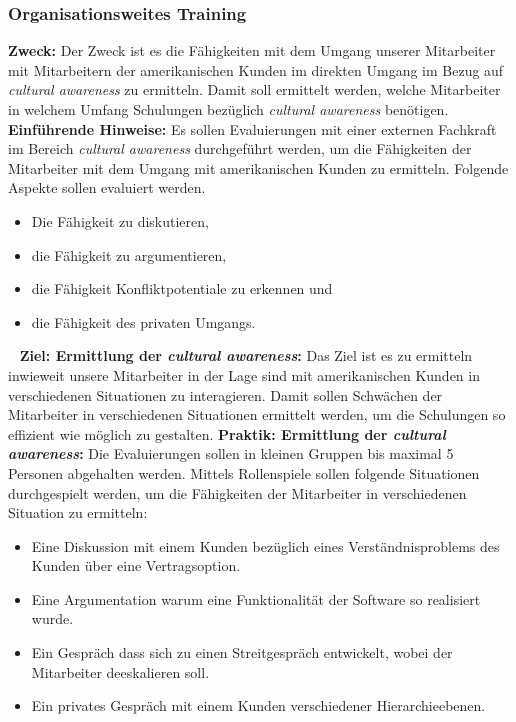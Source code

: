 \subsubsection{Organisationsweites Training}
\label{sec:cmmi-2}
\textbf{Zweck:}
\newline
Der Zweck ist es die Fähigkeiten mit dem Umgang unserer Mitarbeiter mit Mitarbeitern der amerikanischen Kunden im direkten Umgang im Bezug auf \emph{cultural awareness} zu ermitteln. Damit soll ermittelt werden, welche Mitarbeiter in welchem Umfang Schulungen bezüglich \emph{cultural awareness} benötigen.
\newline
\newline
\textbf{Einführende Hinweise:}
\newline
Es sollen Evaluierungen mit einer externen Fachkraft im Bereich \emph{cultural awareness} durchgeführt werden, um die Fähigkeiten der Mitarbeiter mit dem Umgang mit amerikanischen Kunden zu ermitteln. Folgende Aspekte sollen evaluiert werden.
\begin{itemize}
	\item Die Fähigkeit zu diskutieren,
	\item die Fähigkeit zu argumentieren,
	\item die Fähigkeit Konfliktpotentiale zu erkennen und 
	\item die Fähigkeit des privaten Umgangs.
\end{itemize}
\ \newpage
\textbf{Ziel: Ermittlung der \emph{cultural awareness}:}
\newline
Das Ziel ist es zu ermitteln inwieweit unsere Mitarbeiter in der Lage sind mit amerikanischen Kunden in verschiedenen Situationen zu interagieren. Damit sollen Schwächen der Mitarbeiter in verschiedenen Situationen ermittelt werden, um die Schulungen so effizient wie möglich zu gestalten.
\newline
\newline
\textbf{Praktik: Ermittlung der \emph{cultural awareness}:}
\newline
Die Evaluierungen sollen in kleinen Gruppen bis maximal 5 Personen abgehalten werden. Mittels Rollenspiele sollen folgende Situationen durchgespielt werden, um die Fähigkeiten der Mitarbeiter in verschiedenen Situation zu ermitteln:
\begin{itemize}
	\item Eine Diskussion mit einem Kunden bezüglich eines Verständnisproblems des Kunden über eine Vertragsoption.
	\item Eine Argumentation warum eine Funktionalität der Software so realisiert wurde.
	\item Ein Gespräch dass sich zu einen Streitgespräch entwickelt, wobei der Mitarbeiter deeskalieren soll.
	\item Ein privates Gespräch mit einem Kunden verschiedener Hierarchieebenen.
\end{itemize}

